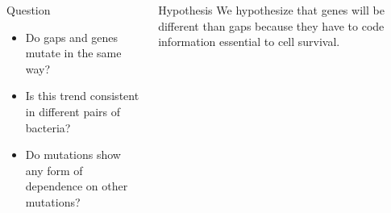 \documentclass[final]{beamer}
\begin{document}
\begin{frame}{}
\begin{columns}[t]
\begin{column}{.32 \linewidth}
\begin{block}{\large Question}
\begin{itemize}
	\item Do gaps and genes mutate in the same way?
	\item Is this trend consistent in different pairs of bacteria?
	\item Do mutations show any form of dependence on other mutations?
\end{itemize} 
\end{block}



\end{column}


\begin{column}{.32 \linewidth}
 \begin{block}{\large Hypothesis}
	We hypothesize that genes will be different than gaps because they have to code information essential to cell survival.
	

\end{block}
\end{column}
\end{columns}
\end{frame}
\end{document}
